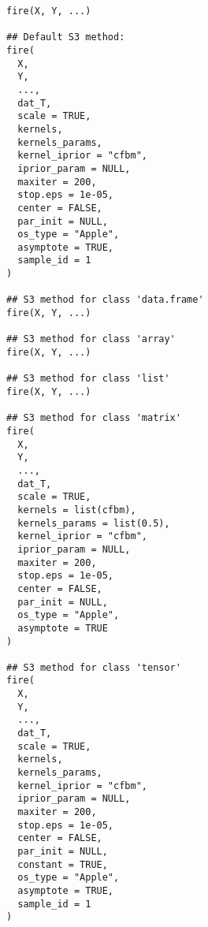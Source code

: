 \documentclass[a4paper]{book}
\begin{document}
%
\begin{Usage}
\begin{verbatim}
fire(X, Y, ...)

## Default S3 method:
fire(
  X,
  Y,
  ...,
  dat_T,
  scale = TRUE,
  kernels,
  kernels_params,
  kernel_iprior = "cfbm",
  iprior_param = NULL,
  maxiter = 200,
  stop.eps = 1e-05,
  center = FALSE,
  par_init = NULL,
  os_type = "Apple",
  asymptote = TRUE,
  sample_id = 1
)

## S3 method for class 'data.frame'
fire(X, Y, ...)

## S3 method for class 'array'
fire(X, Y, ...)

## S3 method for class 'list'
fire(X, Y, ...)

## S3 method for class 'matrix'
fire(
  X,
  Y,
  ...,
  dat_T,
  scale = TRUE,
  kernels = list(cfbm),
  kernels_params = list(0.5),
  kernel_iprior = "cfbm",
  iprior_param = NULL,
  maxiter = 200,
  stop.eps = 1e-05,
  center = FALSE,
  par_init = NULL,
  os_type = "Apple",
  asymptote = TRUE
)

## S3 method for class 'tensor'
fire(
  X,
  Y,
  ...,
  dat_T,
  scale = TRUE,
  kernels,
  kernels_params,
  kernel_iprior = "cfbm",
  iprior_param = NULL,
  maxiter = 200,
  stop.eps = 1e-05,
  center = FALSE,
  par_init = NULL,
  constant = TRUE,
  os_type = "Apple",
  asymptote = TRUE,
  sample_id = 1
)
\end{verbatim}
\end{Usage}
%
\end{document}
